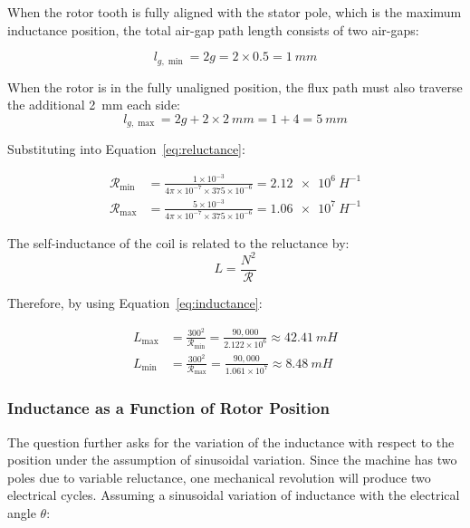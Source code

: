 \documentclass[12pt, a4paper]{article}
\begin{document}
When the rotor tooth is fully aligned with the stator pole, which is the maximum inductance position, the total air-gap path length consists of two air-gaps:

\begin{equation}
    l_{g,\min} = 2g = 2 \times 0.5 = \SI{1}{mm}
\end{equation}

When the rotor is in the fully unaligned position, the flux path must also traverse the additional \SI{2}{mm} each side:
\begin{equation}
    l_{g,\max} = 2g + 2 \times \SI{2}{mm} = 1 + 4 = \SI{5}{mm}
\end{equation}

Substituting into Equation~\eqref{eq:reluctance}:

\begin{align}
    \mathcal{R}_{\min} &= \frac{1 \times 10^{-3}}{4\pi \times 10^{-7} \times 375 \times 10^{-6}}
                         = \SI{2.12e6}{H^{-1}} \\[6pt]
    \mathcal{R}_{\max} &= \frac{5 \times 10^{-3}}{4\pi \times 10^{-7} \times 375 \times 10^{-6}}
                         = \SI{1.06e7}{H^{-1}}
\end{align}

The self-inductance of the coil is related to the reluctance by:
\begin{equation}
    L = \frac{N^2}{\mathcal{R}}
    \label{eq:inductance}
\end{equation}

Therefore, by using Equation~\eqref{eq:inductance}:

\begin{align}
    L_{\max} &= \frac{300^2}{\mathcal{R}_{\min}} = \frac{90{,}000}{2.122 \times 10^6} \approx \SI{42.41}{mH} \\[6pt]
    L_{\min} &= \frac{300^2}{\mathcal{R}_{\max}} = \frac{90{,}000}{1.061 \times 10^7} \approx \SI{8.48}{mH}
\end{align}

\subsubsection{Inductance as a Function of Rotor Position}

The question further asks for the variation of the inductance with respect to the position under the assumption of sinusoidal variation. Since the machine has two poles due to variable reluctance, one mechanical revolution will produce two electrical cycles. Assuming a sinusoidal variation of inductance with the electrical angle $\theta$:
\end{document}
